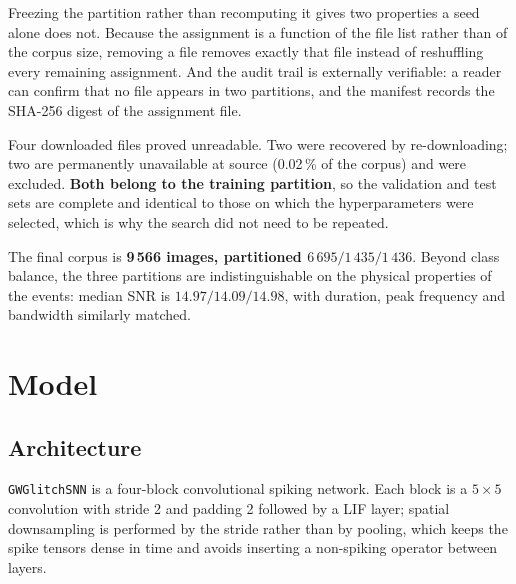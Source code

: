 Freezing the partition rather than recomputing it gives two properties a seed
alone does not. Because the assignment is a function of the file list rather than
of the corpus size, removing a file removes exactly that file instead of
reshuffling every remaining assignment. And the audit trail is externally
verifiable: a reader can confirm that no file appears in two partitions, and the
manifest records the SHA-256 digest of the assignment file.

Four downloaded files proved unreadable. Two were recovered by re-downloading;
two are permanently unavailable at source (0.02\,\% of the corpus) and were
excluded. \textbf{Both belong to the training partition}, so the validation and
test sets are complete and identical to those on which the hyperparameters were
selected, which is why the search did not need to be repeated.

The final corpus is \textbf{9\,566 images, partitioned $6\,695 / 1\,435 /
1\,436$}. Beyond class balance, the three partitions are indistinguishable on the
physical properties of the events: median SNR is $14.97 / 14.09 / 14.98$, with
duration, peak frequency and bandwidth similarly matched.

\section{Model}

\subsection{Architecture}

\texttt{GWGlitchSNN} is a four-block convolutional spiking network. Each block is
a $5 \times 5$ convolution with stride 2 and padding 2 followed by a LIF layer;
spatial downsampling is performed by the stride rather than by pooling, which
keeps the spike tensors dense in time and avoids inserting a non-spiking operator
between layers.

